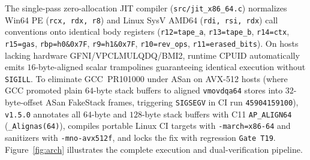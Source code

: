\documentclass[11pt,reqno]{amsart}
\theoremstyle{plain}
\theoremstyle{definition}
\theoremstyle{remark}
\newcommand{\code}[1]{{\footnotesize\nolinkurl{#1}}}
\begin{document}
The single-pass zero-allocation JIT compiler (\code{src/jit_x86_64.c}) normalizes Win64 PE (\code{rcx, rdx, r8}) and Linux SysV AMD64 (\code{rdi, rsi, rdx}) call conventions onto identical body registers (\code{r12=tape_a}, \code{r13=tape_b}, \code{r14=ctx}, \code{r15=gas}, \code{rbp=h0\&0x7F}, \code{r9=h1\&0x7F}, \code{r10=rev_ops}, \code{r11=erased_bits}). On hosts lacking hardware GFNI/VPCLMULQDQ/BMI2, runtime CPUID automatically emits $16$-byte-aligned scalar trampolines guaranteeing identical execution without \code{SIGILL}. To eliminate GCC~PR101000 under ASan on AVX-512 hosts (where GCC promoted plain $64$-byte stack buffers to aligned \code{vmovdqa64} stores into $32$-byte-offset ASan FakeStack frames, triggering \code{SIGSEGV} in CI run \code{45904159100}), \code{v1.5.0} annotates all $64$-byte and $128$-byte stack buffers with C11 \code{AP_ALIGN64} (\code{_Alignas(64)}), compiles portable Linux CI targets with \code{-march=x86-64} and sanitizers with \code{-mno-avx512f}, and locks the fix with regression \code{Gate T19}. Figure~\ref{fig:arch} illustrates the complete execution and dual-verification pipeline.
\end{document}
